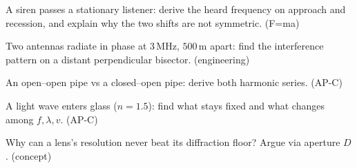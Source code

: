 \begin{exercise}[medium]
A siren passes a stationary listener: derive the heard frequency on
approach and recession, and explain why the two shifts are not
symmetric. (F=ma)
\end{exercise}
\begin{exercise}[medium]
Two antennas radiate in phase at $3$\,MHz, $500$\,m apart: find the
interference pattern on a distant perpendicular bisector. (engineering)
\end{exercise}
\begin{exercise}[medium]
An open--open pipe vs a closed--open pipe: derive both harmonic
series. (AP-C)
\end{exercise}
\begin{exercise}[medium]
A light wave enters glass ($n=1.5$): find what stays fixed and what
changes among $f,\lambda,v$. (AP-C)
\end{exercise}
\begin{exercise}[medium]
Why can a lens's resolution never beat its diffraction floor? Argue
via aperture $D$. (concept)
\end{exercise}
